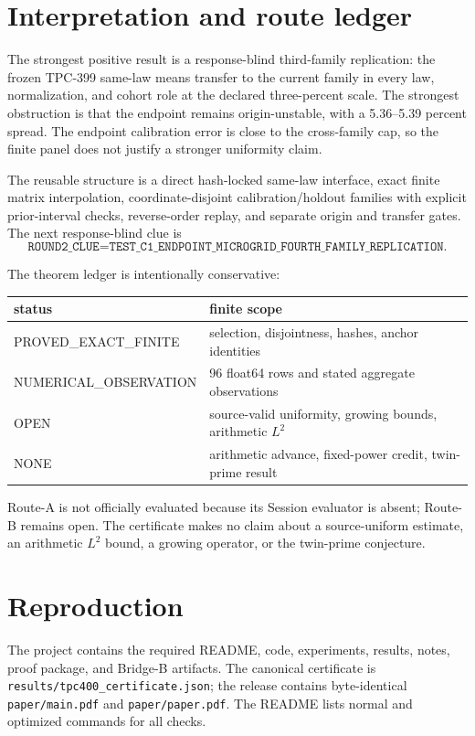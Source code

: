 \documentclass[10pt]{article}
\begin{document}
\section{Interpretation and route ledger}

The strongest positive result is a response-blind third-family replication:
the frozen TPC-399 same-law means transfer to the current family in every law,
normalization, and cohort role at the declared three-percent scale.  The
strongest obstruction is that the endpoint remains origin-unstable, with a
5.36--5.39 percent spread.  The endpoint calibration error is close to the
cross-family cap, so the finite panel does not justify a stronger uniformity
claim.

The reusable structure is a direct hash-locked same-law interface, exact finite
matrix interpolation, coordinate-disjoint calibration/holdout families with
explicit prior-interval checks, reverse-order replay, and separate origin and
transfer gates.  The next response-blind clue is
\[
\texttt{ROUND2\_CLUE=TEST\_C1\_ENDPOINT\_MICROGRID\_FOURTH\_FAMILY\_REPLICATION}.
\]

The theorem ledger is intentionally conservative:
\begin{center}
\begin{tabular}{@{}ll@{}}
\toprule
status & finite scope\\
\midrule
PROVED\_EXACT\_FINITE & selection, disjointness, hashes, anchor identities\\
NUMERICAL\_OBSERVATION & 96 float64 rows and stated aggregate observations\\
OPEN & source-valid uniformity, growing bounds, arithmetic $L^2$\\
NONE & arithmetic advance, fixed-power credit, twin-prime result\\
\bottomrule
\end{tabular}
\end{center}
Route-A is not officially evaluated because its Session evaluator is absent;
Route-B remains open.  The certificate makes no claim about a source-uniform
estimate, an arithmetic $L^2$ bound, a growing operator, or the twin-prime
conjecture.

\section*{Reproduction}

The project contains the required README, code, experiments, results, notes,
proof package, and Bridge-B artifacts.  The canonical certificate is
\texttt{results/tpc400\_certificate.json}; the release contains byte-identical
\texttt{paper/main.pdf} and \texttt{paper/paper.pdf}.  The README lists normal
and optimized commands for all checks.
\end{document}

